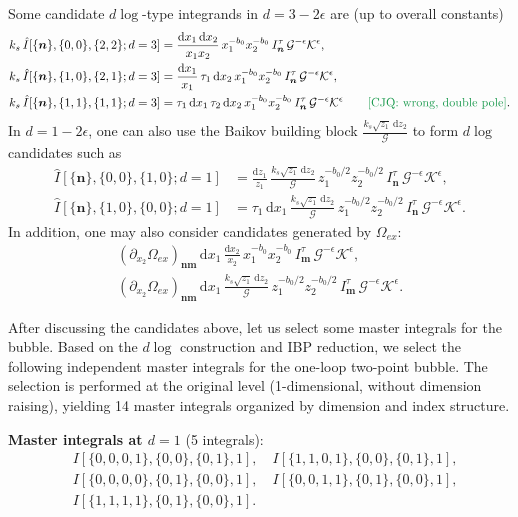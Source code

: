 \documentclass[a4paper]{article}
\newcommand{\n}{\nonumber}
\def\di{{\mathrm{d}}}
\def\ep{\epsilon}
\newcommand{\mG}{\mathcal{G}}
\newcommand{\mK}{\mathcal{K}}
\newcommand{\cjq}[1]{{\color[rgb]{.1,.6,.3}{[{CJQ:} #1]}}}
\begin{document}
Some candidate $d\log$-type integrands in $d=3-2\ep$ are (up to overall constants)
\begin{align}
	k_s\,\hat{I}[\{\bm n\},\{0,0\},\{2,2\};d=3]
	&= \frac{\di x_1\,\di x_2}{x_1 x_2}\,x_1^{-b_0}x_2^{-b_0}\,I^{\tau}_{\bm n}\,\mG^{-\ep}\mK^{\ep}, \n\\
	k_s\,\hat{I}[\{\bm n\},\{1,0\},\{2,1\};d=3]
	&= \frac{\di x_1}{x_1}\,\tau_1\,\di x_2\,x_1^{-b_0}x_2^{-b_0}\,I^{\tau}_{\bm n}\,\mG^{-\ep}\mK^{\ep}, \n\\
	k_s\,\hat{I}[\{\bm n\},\{1,1\},\{1,1\};d=3]
	&= \tau_1\,\di x_1\,\tau_2\,\di x_2\,x_1^{-b_0}x_2^{-b_0}\,I^{\tau}_{\bm n}\,\mG^{-\ep}\mK^{\ep}\qquad \text{\cjq{wrong, double pole}}.
\end{align}
In $d=1-2\ep$, one can also use the Baikov building block $\frac{k_s\sqrt{z_1}\,\di z_2}{\mG}$ to form $d\log$ candidates such as
\begin{align}
	\hat{I}[\{\bm n\},\{0,0\},\{1,0\};d=1]
	&= \frac{\di z_1}{z_1}\,\frac{k_s\sqrt{z_1}\,\di z_2}{\mG}\,
	z_1^{-b_0/2}z_2^{-b_0/2}\,I^{\tau}_{\bm n}\,\mG^{-\ep}\mK^{\ep}, \n\\
	\hat{I}[\{\bm n\},\{1,0\},\{0,0\};d=1]
	&= \tau_1\,\di x_1\,\frac{k_s\sqrt{z_1}\,\di z_2}{\mG}\,
	z_1^{-b_0/2}z_2^{-b_0/2}\,I^{\tau}_{\bm n}\,\mG^{-\ep}\mK^{\ep}.
\end{align}
In addition, one may also consider candidates generated by $\Omega_{ex}$:
\begin{align}
	(\partial_{x_2}\Omega_{ex})_{\bm n \bm m}\,\di x_1\,\frac{\di x_2}{x_2}\,
	x_1^{-b_0}x_2^{-b_0}\,I^{\tau}_{\bm m}\,\mG^{-\ep}\mK^{\ep}, \n\\
	(\partial_{x_2}\Omega_{ex})_{\bm n \bm m}\,\di x_1\,\frac{k_s\sqrt{z_1}\,\di z_2}{\mG}\,
	z_1^{-b_0/2}z_2^{-b_0/2}\,I^{\tau}_{\bm m}\,\mG^{-\ep}\mK^{\ep}.
\end{align}

After discussing the candidates above, let us select some master integrals for the bubble. Based on the $d\log$ construction and IBP reduction, we select the following independent master integrals for the one-loop two-point bubble. The selection is performed at the original level (1-dimensional, without dimension raising), yielding 14 master integrals organized by dimension and index structure.

\textbf{Master integrals at $d=1$} (5 integrals):
\begin{align}
	& I[\{0, 0, 0, 1\}, \{0, 0\}, \{0, 1\}, 1], \quad
	I[\{1, 1, 0, 1\}, \{0, 0\}, \{0, 1\}, 1], \nonumber\\
	& I[\{0, 0, 0, 0\}, \{0, 1\}, \{0, 0\}, 1], \quad
	I[\{0, 0, 1, 1\}, \{0, 1\}, \{0, 0\}, 1], \nonumber\\
	& I[\{1, 1, 1, 1\}, \{0, 1\}, \{0, 0\}, 1].
\end{align}
\end{document}
